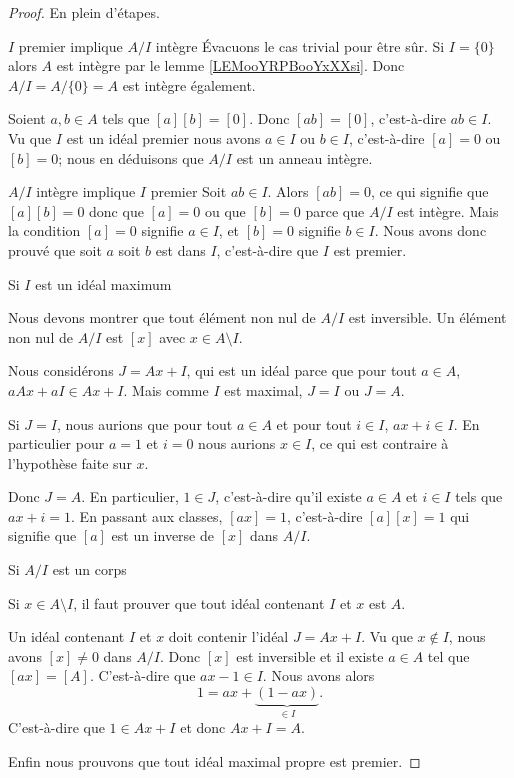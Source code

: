\begin{proof}
    En plein d'étapes.
    \begin{subproof}
        \item[\( I\) premier implique \( A/I\) intègre]
            Évacuons le cas trivial pour être sûr. Si \( I=\{ 0 \}\) alors \( A\) est intègre par le lemme \ref{LEMooYRPBooYxXXsi}. Donc \( A/I=A/\{ 0 \}=A\) est intègre également.

            Soient \( a,b\in A\) tels que \( [a][b]=[0]\). Donc \( [ab]=[0]\), c'est-à-dire \( ab\in I\). Vu que \( I\) est un idéal premier nous avons \( a\in I\) ou \( b\in I\), c'est-à-dire \( [a]=0\) ou \( [b]=0\); nous en déduisons que \( A/I\) est un anneau intègre.
        \item[\( A/I\) intègre implique \( I\) premier]
            Soit \( ab\in I\). Alors \( [ab]=0\), ce qui signifie que \( [a][b]=0\) donc que \( [a]=0\) ou que \( [b]=0\) parce que \( A/I\) est intègre. Mais la condition \( [a]=0\) signifie \( a\in I\), et \( [b]=0\) signifie \( b\in I\). Nous avons donc prouvé que soit \( a\) soit \( b\) est dans \( I\), c'est-à-dire que \( I\) est premier.
        \item[Si \( I\) est un idéal maximum]

            Nous devons montrer que tout élément non nul de \( A/I\) est inversible. Un élément non nul de \( A/I\) est \( [x]\) avec \( x\in A\setminus I\). 
            
            Nous considérons \( J=Ax+I\), qui est un idéal parce que pour tout \( a\in A\), \( aAx+aI\in Ax+I\). Mais comme \( I\) est maximal, \( J=I\) ou \( J=A\).

            Si \( J=I\), nous aurions que pour tout \( a\in A\) et pour tout \( i\in I\), \( ax+i\in I\). En particulier pour \( a=1\) et \( i=0\) nous aurions \( x\in I\), ce qui est contraire à l'hypothèse faite sur \( x\).

            Donc \( J=A\). En particulier, \( 1\in J\), c'est-à-dire qu'il existe \( a\in A\) et \( i\in I\) tels que \( ax+i=1\). En passant aux classes, \( [ax]=1\), c'est-à-dire \( [a][x]=1\) qui signifie que \( [a]\) est un inverse de \( [x]\) dans \( A/I\).

        \item[Si \( A/I\) est un corps]

            Si \( x\in A\setminus I\), il faut prouver que tout idéal contenant \( I\) et \( x\) est \( A\).

            Un idéal contenant \( I\) et \( x\) doit contenir l'idéal \( J=Ax+I\). Vu que \( x\notin I\), nous avons \( [x]\neq 0\) dans \( A/I\). Donc \( [x] \) est inversible et il existe \( a\in A\) tel que \( [ax]=[A]\). C'est-à-dire que $ax-1\in I$. Nous avons alors
            \begin{equation}
                1=ax+\underbrace{(1-ax)}_{\in I}.
            \end{equation}
            C'est-à-dire que \( 1\in Ax+I\) et donc \( Ax+I=A\).
    \end{subproof}
    Enfin nous prouvons que tout idéal maximal propre est premier. 


\end{proof}
